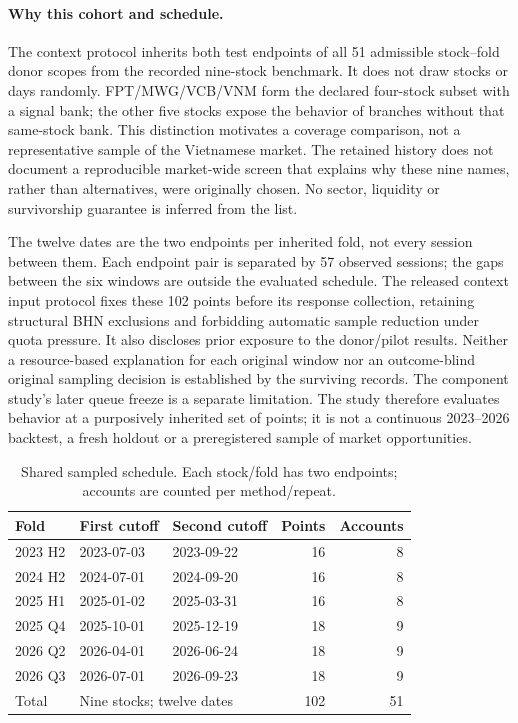 \paragraph{Why this cohort and schedule.}
The context protocol inherits both test endpoints of all 51 admissible
stock--fold donor scopes from the recorded nine-stock benchmark. It does
not draw stocks or days randomly. FPT/MWG/VCB/VNM form the declared
four-stock subset with a signal bank; the other five stocks expose the
behavior of branches without that same-stock bank. This distinction
motivates a coverage comparison, not a representative sample of the
Vietnamese market. The retained history does not document a reproducible
market-wide screen that explains why these nine names, rather than
alternatives, were originally chosen. No sector, liquidity or
survivorship guarantee is inferred from the list.

The twelve dates are the two endpoints per inherited fold, not every
session between them. Each endpoint pair is separated by 57 observed
sessions; the gaps between the six windows are outside the evaluated
schedule. The released context input protocol fixes these 102 points
before its response collection, retaining structural BHN exclusions and
forbidding automatic sample reduction under quota pressure. It also
discloses prior exposure to the donor/pilot results. Neither a
resource-based explanation for each original window nor an outcome-blind
original sampling decision is established by the surviving records.
The component study's later queue freeze is a separate limitation.
The study therefore evaluates behavior at a purposively inherited set
of points; it is not a continuous 2023--2026 backtest, a fresh holdout or
a preregistered sample of market opportunities.

\begin{table}[!htb]\centering\small{}
\caption[Shared sampled market schedule]{Shared sampled schedule. Each stock/fold has two endpoints;
accounts are counted per method/repeat.}\label{tab:schedule}
\begin{tabular}{@{}l llrr@{}}\toprule
Fold & First cutoff & Second cutoff & Points & Accounts\\\midrule
2023 H2 & 2023-07-03 & 2023-09-22 &16&8\\
2024 H2 & 2024-07-01 & 2024-09-20 &16&8\\
2025 H1 & 2025-01-02 & 2025-03-31 &16&8\\
2025 Q4 & 2025-10-01 & 2025-12-19 &18&9\\
2026 Q2 & 2026-04-01 & 2026-06-24 &18&9\\
2026 Q3 & 2026-07-01 & 2026-09-23 &18&9\\\midrule
Total & \multicolumn{2}{l}{Nine stocks; twelve dates} &102&51\\\bottomrule
\end{tabular}\end{table}

